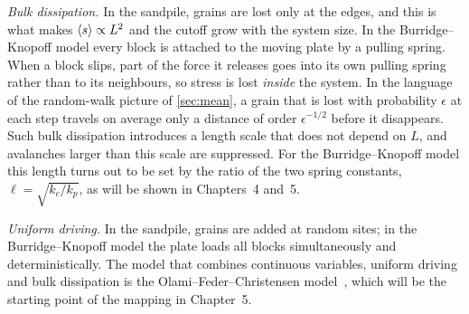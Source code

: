 \emph{Bulk dissipation.} In the sandpile, grains are lost only at the edges, and this is what makes $\left\langle s \right\rangle\propto L^2$ and the cutoff grow with
the system size. In the Burridge--Knopoff model every block is attached to the moving plate by a pulling spring. When a block slips, part of the
force it releases goes into its own pulling spring rather than to its neighbours, so stress is lost \emph{inside} the system. In the language of
the random-walk picture of \cref{sec:mean}, a grain that is lost with probability $\epsilon$ at each step travels on average only a distance of
order $\epsilon^{-1/2}$ before it disappears. Such bulk dissipation introduces a length scale that does not depend on $L$, and avalanches larger
than this scale are suppressed. For the Burridge--Knopoff model this length turns out to be set by the ratio of the two spring constants,
$\ell = \sqrt{k_c/k_p}$, as will be shown in Chapters~4 and~5.

\emph{Uniform driving.} In the sandpile, grains are added at random sites; in the Burridge--Knopoff model the plate loads all blocks
simultaneously and deterministically. The model that combines continuous variables, uniform driving and bulk dissipation is the
Olami--Feder--Christensen model~\cite{OFC1992}, which will be the starting point of the mapping in Chapter~5.
